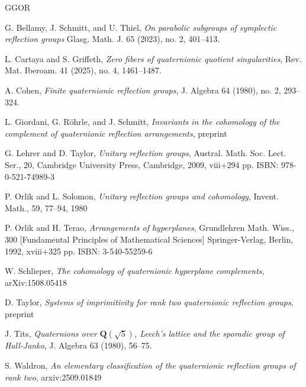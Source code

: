 \documentclass[11pt, reqno]{amsart}
\numberwithin{equation}{section}
\theoremstyle{definition}
\theoremstyle{plain}
\newcommand{\QQ}{\mathbf{Q}}
\begin{document}
%
\def\cprime{$'$} \def\cprime{$'$}
\begin{thebibliography}{GGOR}


  G. Bellamy, J. Schmitt, and U. Thiel, \emph{On parabolic subgroups of symplectic reflection groups}
Glasg. Math. J. 65 (2023), no. 2, 401–413.

  L. Cartaya and S. Griffeth, \emph{Zero fibers of quaternionic quotient singularities},
Rev. Mat. Iberoam. 41 (2025), no. 4, 1461--1487.

 A. Cohen, \emph{Finite quaternionic reflection groups}, 
J. Algebra 64 (1980), no. 2, 293--324.
 
 L. Giordani, G. Röhrle, and J. Schmitt, \emph{Invariants in the cohomology of the complement of quaternionic reflection arrangements}, preprint
 
  G. Lehrer and D. Taylor, \emph{Unitary reflection groups}, Austral. Math. Soc. Lect. Ser., 20,
Cambridge University Press, Cambridge, 2009, viii+294 pp.
ISBN: 978-0-521-74989-3
 
  P. Orlik and L. Solomon, \emph{Unitary reflection groups and cohomology}, Invent. Math., 59, 77--94, 1980
 
  P. Orlik and H. Terao, \emph{Arrangements of hyperplanes},
Grundlehren Math. Wiss., 300 [Fundamental Principles of Mathematical Sciences]
Springer-Verlag, Berlin, 1992, xviii+325 pp.
ISBN: 3-540-55259-6
 
 W. Schlieper, \emph{The cohomology of quaternionic hyperplane complements}, arXiv:1508.05418

 D. Taylor, \emph{Systems of imprimitivity for rank two quaternionic reflection groups}, preprint

 J. Tits, \emph{Quaternions over $\QQ(\sqrt{5})$, Leech’s lattice and the sporadic group of Hall-Janko}, J. Algebra 63 (1980), 56--75.

 S. Waldron, \emph{An elementary classification of the quaternionic reflection groups of rank two}, arxiv:2509.01849

 \end{thebibliography}
\end{document}
